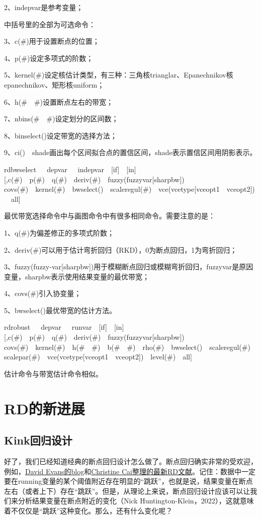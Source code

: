 \documentclass[cn,12pt,math=newtx,citestyle=gb7714-2015,bibstyle=gb7714-2015]{elegantbook}
\begin{document}
	2、indepvar是参考变量；
	
	中括号里的全部为可选命令：
	
	3、c(\#)用于设置断点的位置；
	
	4、p(\#)设定多项式的阶数；
	
	5、kernel(\#)设定核估计类型，有三种：三角核trianglar、Epanechnikov核epanechnikov、矩形核uniform；
	
	6、h(\#~~\#)设置断点左右的带宽；
	
	7、nbins(\#~~\#)设定划分的区间数；
	
	8、binselect()设定带宽的选择方法；
	
	9、ci()~~shade画出每个区间拟合点的置信区间，shade表示置信区间用阴影表示。
	
	rdbwselect~~~depvar~~~indepvar~~[if]~~[in][,c(\#)~~p(\#)~~q(\#)~~deriv(\#)~~fuzzy(fuzzyvar[sharpbw])~~\\
	covs(\#)~~kernel(\#)~~bwselect()~~scaleregul(\#)~~vce(vcetype[vceopt1~~vceopt2])~~all]
	
	最优带宽选择命令中与画图命令中有很多相同命令。需要注意的是：
	
	1、q(\#)为偏差修正的多项式阶数；
	
	2、deriv(\#)可以用于估计弯折回归（RKD），0为断点回归，1为弯折回归；
	
	3、fuzzy(fuzzy-var[sharpbw])用于模糊断点回归或模糊弯折回归，fuzzyvar是原因变量，sharpbw表示使用结果变量的最优带宽；
	
	4、covs(\#)引入协变量；
	
	5、bwselect()最优带宽的估计方法。
	
	rdrobust~~~depvar~~~runvar~~[if]~~[in][,c(\#)~~p(\#)~~q(\#)~~deriv(\#)~~fuzzy(fuzzyvar[sharpbw])~~\\
	covs(\#)~~kernel(\#)~~h(\#~~\#)~~b(\#~~\#)~~rho(\#)~~bwselect()~~scaleregul(\#)~~\\
	scalepar(\#)~~vce(vcetype[vceopt1~~vceopt2])~~level(\#)~~all]
	
	估计命令与带宽估计命令相似。
	
	\section{RD的新进展}
	\subsection{Kink回归设计}
	好了，我们已经知道经典的断点回归设计怎么做了。断点回归确实非常的受欢迎，例如，\href{https://blogs.worldbank.org/impactevaluations/regression-discontinuity-porn}{David Evans的blog}和\href{https://christinecai.github.io/PublicGoods/applied_micro_methods.pdf}{Christine Cai整理的最新RD文献}。记住：数据中一定要在running变量的某个阈值附近存在明显的“跳跃”，也就是说，结果变量在断点左右（或者上下）存在“跳跃”。但是，从理论上来说，断点回归设计应该可以让我们来分析结果变量在断点附近的变化（Nick Huntington-Klein，2022），这就意味着不仅仅是“跳跃”这种变化。那么，还有什么变化呢？
	
\end{document}
